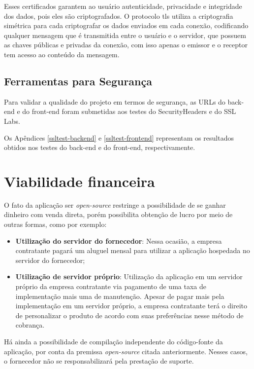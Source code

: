 \documentclass[
    12pt,               %
    openright,          %
    oneside,
    a4paper,            %
    english,            %
    brazil              %
    ]{ifsp-spo-inf-ctds} %
\begin{document}
Esses certificados garantem ao usuário autenticidade, privacidade e integridade dos dados, pois eles são criptografados. O protocolo \ac{tls} utiliza a criptografia simétrica para cada criptografar os dados enviados em cada conexão, codificando qualquer mensagem que é transmitida entre o usuário e o servidor, que possuem as chaves públicas e privadas da conexão, com isso apenas o emissor e o receptor tem acesso ao conteúdo da mensagem.

\subsection {Ferramentas para Segurança}
Para validar a qualidade do projeto em termos de segurança, as URLs do \gls{back-end} e do \gls{front-end} foram submetidas aos testes do SecurityHeaders e do SSL Labs. 

Os Apêndices \ref{ssltest-backend} e \ref{ssltest-frontend} representam os resultados obtidos nos testes do \gls{back-end} e do \gls{front-end}, respectivamente.


\section{Viabilidade financeira}
O fato da aplicação ser \textit{\gls{open-source}} restringe a possibilidade de se ganhar dinheiro com venda direta, porém possibilita obtenção de lucro por meio de outras formas, como por exemplo:

\begin{itemize}
   \item \textbf{Utilização do servidor do fornecedor}: Nessa ocasião, a empresa contratante pagará um aluguel mensal para utilizar a aplicação hospedada no servidor do fornecedor;
   \item \textbf{Utilização de servidor próprio}: Utilização da aplicação em um servidor próprio da empresa contratante via pagamento de uma taxa de implementação mais uma de manutenção. Apesar de pagar mais pela implementação em um servidor próprio, a empresa contratante terá o direito de personalizar o produto de acordo com suas preferências nesse método de cobrança.
\end{itemize}

Há ainda a possibilidade de compilação independente do código-fonte da aplicação, por conta da premissa \textit{\gls{open-source}} citada anteriormente. Nesses casos, o fornecedor não se responsabilizará pela prestação de suporte.
\end{document}
